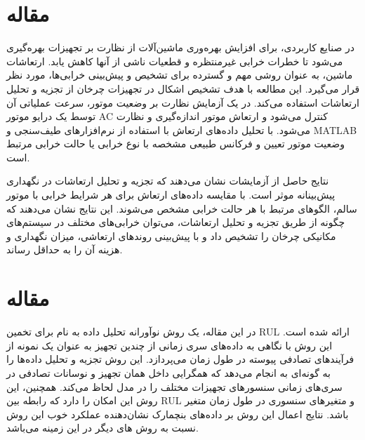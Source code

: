 \documentclass[a4paper,10pt]{article}
\begin{document}

\section{مقاله \textcolor{blue}{\cite{article4}}}
در صنایع کاربردی، برای افزایش بهره‌وری ماشین‌آلات از نظارت بر تجهیزات بهره‌گیری می‌شود تا خطرات خرابی غیرمنتظره و قطعیات ناشی از آنها کاهش یابد. ارتعاشات ماشین، به عنوان روشی مهم و گسترده برای تشخیص و پیش‌بینی خرابی‌ها، مورد نظر قرار می‌گیرد. این مطالعه با هدف تشخیص اشکال در تجهیزات چرخان از تجزیه و تحلیل ارتعاشات استفاده می‌کند. در یک آزمایش نظارت بر وضعیت موتور، سرعت عملیاتی آن توسط یک درایو موتور AC کنترل می‌شود و ارتعاش موتور اندازه‌گیری و نظارت می‌شود. با تحلیل داده‌های ارتعاش با استفاده از نرم‌افزارهای طیف‌سنجی و MATLAB وضعیت موتور تعیین و فرکانس طبیعی مشخصه با نوع خرابی یا حالت خرابی مرتبط است.

نتایج حاصل از آزمایشات نشان می‌دهند که تجزیه و تحلیل ارتعاشات در نگهداری پیش‌بینانه موثر است. با مقایسه داده‌های ارتعاش برای هر شرایط خرابی با موتور سالم، الگوهای مرتبط با هر حالت خرابی مشخص می‌شوند. این نتایج نشان می‌دهند که چگونه از طریق تجزیه و تحلیل ارتعاشات، می‌توان خرابی‌های مختلف در سیستم‌های مکانیکی چرخان را تشخیص داد و با پیش‌بینی روندهای ارتعاشی، میزان نگهداری و هزینه آن را به حداقل رساند.


\section{مقاله \textcolor{blue}{\cite{article8}}}
در این مقاله، یک روش نوآورانه تحلیل داده‌ به نام  برای تخمین RUL ارائه شده است. این روش با نگاهی به داده‌های سری زمانی از چندین تجهیز به عنوان یک نمونه از فرآیندهای تصادفی پیوسته در طول زمان می‌پردازد. این روش تجزیه و تحلیل داده‌ها را به گونه‌ای به انجام می‌دهد که همگرایی داخل همان تجهیز و نوسانات تصادفی در سری‌های زمانی سنسورهای تجهیزات مختلف را در مدل لحاظ می‌کند. همچنین، این روش این امکان را دارد که رابطه بین RUL و متغیرهای سنسوری در طول زمان متغیر باشد. نتایج اعمال این روش بر داده‌های بنچمارک  نشان‌دهنده عملکرد خوب این روش نسبت به روش های دیگر در این زمینه می‌باشد.

\end{document}
